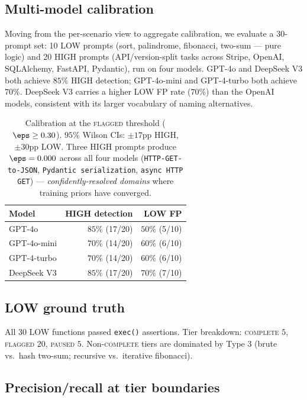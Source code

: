 \subsection{Multi-model calibration}
\label{subsec:calibration}

Moving from the per-scenario view to aggregate calibration, we evaluate
a 30-prompt set: 10 LOW prompts (sort, palindrome, fibonacci, two-sum
--- pure logic) and 20 HIGH prompts (API/version-split tasks across
Stripe, OpenAI, SQLAlchemy, FastAPI, Pydantic), run on four models.
GPT-4o and DeepSeek V3 both achieve $85\%$ HIGH detection; GPT-4o-mini
and GPT-4-turbo both achieve $70\%$. DeepSeek V3 carries a higher LOW
FP rate ($70\%$) than the OpenAI models, consistent with its larger
vocabulary of naming alternatives.

\begin{table}[h]
\centering
\small
\begin{tabular}{lrr}
\toprule
Model & HIGH detection & LOW FP \\
\midrule
GPT-4o         & $85\%$ (17/20) & $50\%$ (5/10) \\
GPT-4o-mini    & $70\%$ (14/20) & $60\%$ (6/10) \\
GPT-4-turbo    & $70\%$ (14/20) & $60\%$ (6/10) \\
DeepSeek V3    & $85\%$ (17/20) & $70\%$ (7/10) \\
\bottomrule
\end{tabular}
\caption{Calibration at the \textsc{flagged} threshold ($\eps \ge
0.30$). $95\%$ Wilson CIs: $\pm 17$pp HIGH, $\pm 30$pp LOW. Three
HIGH prompts produce $\eps = 0.000$ across all four models
(\texttt{HTTP-GET-to-JSON}, \texttt{Pydantic serialization},
\texttt{async HTTP GET}) --- \emph{confidently-resolved domains} where
training priors have converged.}
\label{tab:calibration}
\end{table}

\subsection{LOW ground truth}
\label{subsec:low-gt}

All 30 LOW functions passed \texttt{exec()} assertions. Tier
breakdown: \textsc{complete} $5$, \textsc{flagged} $20$,
\textsc{paused} $5$. Non-\textsc{complete} tiers are dominated by
Type 3 (brute vs.\ hash two-sum; recursive vs.\ iterative
fibonacci).

\subsection{Precision/recall at tier boundaries}
\label{subsec:pr}

